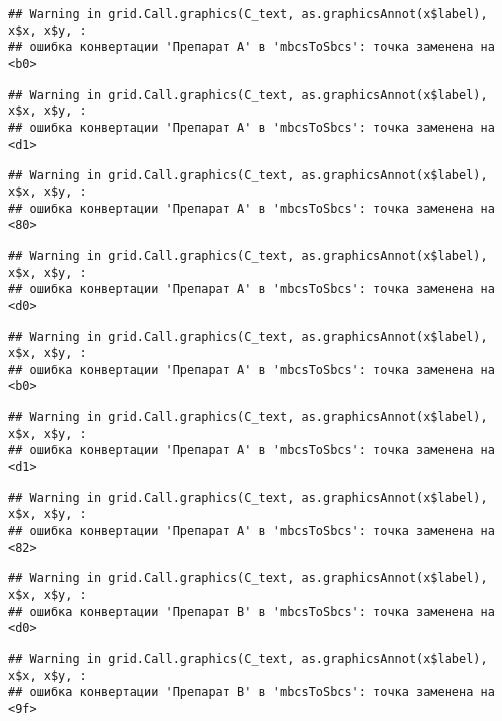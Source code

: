 \documentclass[
]{article}
\begin{document}
\begin{verbatim}
## Warning in grid.Call.graphics(C_text, as.graphicsAnnot(x$label), x$x, x$y, :
## ошибка конвертации 'Препарат A' в 'mbcsToSbcs': точка заменена на <b0>
\end{verbatim}

\begin{verbatim}
## Warning in grid.Call.graphics(C_text, as.graphicsAnnot(x$label), x$x, x$y, :
## ошибка конвертации 'Препарат A' в 'mbcsToSbcs': точка заменена на <d1>
\end{verbatim}

\begin{verbatim}
## Warning in grid.Call.graphics(C_text, as.graphicsAnnot(x$label), x$x, x$y, :
## ошибка конвертации 'Препарат A' в 'mbcsToSbcs': точка заменена на <80>
\end{verbatim}

\begin{verbatim}
## Warning in grid.Call.graphics(C_text, as.graphicsAnnot(x$label), x$x, x$y, :
## ошибка конвертации 'Препарат A' в 'mbcsToSbcs': точка заменена на <d0>
\end{verbatim}

\begin{verbatim}
## Warning in grid.Call.graphics(C_text, as.graphicsAnnot(x$label), x$x, x$y, :
## ошибка конвертации 'Препарат A' в 'mbcsToSbcs': точка заменена на <b0>
\end{verbatim}

\begin{verbatim}
## Warning in grid.Call.graphics(C_text, as.graphicsAnnot(x$label), x$x, x$y, :
## ошибка конвертации 'Препарат A' в 'mbcsToSbcs': точка заменена на <d1>
\end{verbatim}

\begin{verbatim}
## Warning in grid.Call.graphics(C_text, as.graphicsAnnot(x$label), x$x, x$y, :
## ошибка конвертации 'Препарат A' в 'mbcsToSbcs': точка заменена на <82>
\end{verbatim}

\begin{verbatim}
## Warning in grid.Call.graphics(C_text, as.graphicsAnnot(x$label), x$x, x$y, :
## ошибка конвертации 'Препарат B' в 'mbcsToSbcs': точка заменена на <d0>
\end{verbatim}

\begin{verbatim}
## Warning in grid.Call.graphics(C_text, as.graphicsAnnot(x$label), x$x, x$y, :
## ошибка конвертации 'Препарат B' в 'mbcsToSbcs': точка заменена на <9f>
\end{verbatim}
\end{document}
